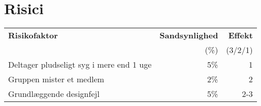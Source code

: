 \section{Risici}
\begin{center}
\begin{tabular}{p{8cm} | r r}
	\textbf{Risikofaktor}						& \textbf{Sandsynlighed}	& \textbf{Effekt} \\
												& \footnotesize{(\%)}		& \footnotesize{(3/2/1)} \\
	\hline
	Deltager pludseligt syg i mere end 1 uge	& 5\%						& 1 \\
	Gruppen mister et medlem					& 2\%						& 2 \\
	Grundlæggende designfejl					& 5\%						& 2-3
\end{tabular}
\end{center}